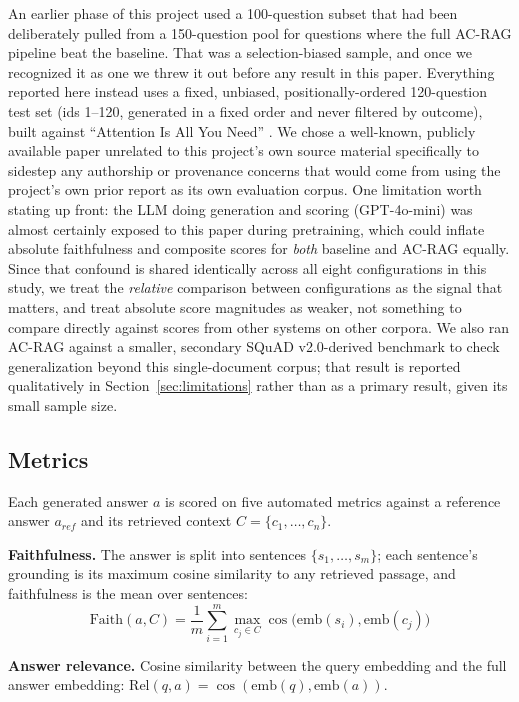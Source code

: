 \documentclass[conference]{IEEEtran}
\begin{document}
An earlier phase of this project used a 100-question subset that had been deliberately
pulled from a 150-question pool for questions where the full AC-RAG pipeline beat the
baseline. That was a selection-biased sample, and once we recognized it as one we threw
it out before any result in this paper. Everything reported here instead uses a fixed,
unbiased, positionally-ordered 120-question test set (ids 1--120, generated in a fixed
order and never filtered by outcome), built against ``Attention Is All You Need''
\cite{vaswani2017attention}. We chose a well-known, publicly available paper unrelated
to this project's own source material specifically to sidestep any authorship or
provenance concerns that would come from using the project's own prior report as its
own evaluation corpus. One limitation worth stating up front: the LLM doing generation
and scoring (GPT-4o-mini) was almost certainly exposed to this paper during
pretraining, which could inflate absolute faithfulness and composite scores for
\emph{both} baseline and AC-RAG equally. Since that confound is shared identically
across all eight configurations in this study, we treat the \emph{relative} comparison
between configurations as the signal that matters, and treat absolute score magnitudes
as weaker, not something to compare directly against scores from other systems on
other corpora. We also ran AC-RAG against a smaller, secondary SQuAD v2.0-derived
benchmark to check generalization beyond this single-document corpus; that result is
reported qualitatively in Section~\ref{sec:limitations} rather than as a primary
result, given its small sample size.

\subsection{Metrics}

Each generated answer $a$ is scored on five automated metrics against a reference
answer $a_{ref}$ and its retrieved context $C = \{c_1, \dots, c_n\}$.

\textbf{Faithfulness.} The answer is split into sentences $\{s_1,\dots,s_m\}$; each
sentence's grounding is its maximum cosine similarity to any retrieved passage, and
faithfulness is the mean over sentences:
\begin{equation}
\mathrm{Faith}(a, C) = \frac{1}{m}\sum_{i=1}^{m} \max_{c_j \in C} \cos\!\big(\mathrm{emb}(s_i), \mathrm{emb}(c_j)\big)
\end{equation}

\textbf{Answer relevance.} Cosine similarity between the query embedding and the full
answer embedding: $\mathrm{Rel}(q, a) = \cos(\mathrm{emb}(q), \mathrm{emb}(a))$.
\end{document}
